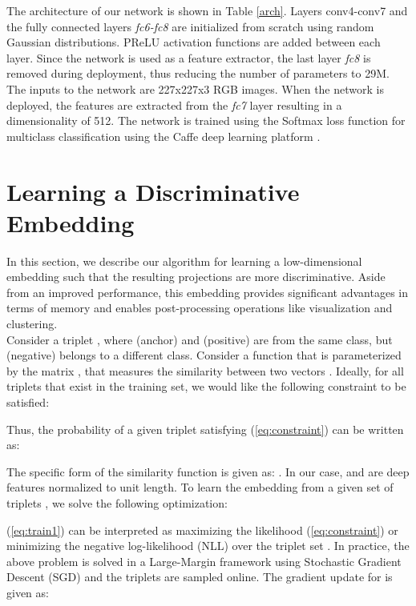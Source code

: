 \documentclass[10pt,twocolumn,letterpaper]{article}
\begin{document}
The architecture of our network is shown in Table \ref{arch}. Layers
conv4-conv7 and the fully connected layers \textit{fc6-fc8} are initialized from
scratch using random Gaussian distributions. PReLU activation functions are added
between each layer. Since the network is used as a feature extractor, the last
layer \textit{fc8} is removed during deployment, thus reducing the number of
parameters to 29M. The inputs to the network are 227x227x3 RGB images. When the
network is deployed, the features are extracted from the \textit{fc7} layer
resulting in a dimensionality of 512. The network is trained using the Softmax
loss function for multiclass classification using the Caffe deep learning
platform \cite{caffe}. 


 \section{Learning a Discriminative Embedding}\label{tpe}
In this section, we describe our algorithm for learning a low-dimensional
embedding such that the resulting projections are more discriminative. Aside
from an improved performance, this embedding provides significant advantages in
terms of memory and enables post-processing operations like visualization and clustering. \\

Consider a triplet , where  (anchor)
and  (positive) are from the same class, but  (negative)
belongs to a different class. Consider a function  that is parameterized by the matrix , that measures the similarity between two vectors
. Ideally, for all triplets  that exist
in the training set, we would like the following constraint to be satisfied: 

\vspace{-5mm}

Thus, the probability of a given triplet  satisfying (\ref{eq:constraint}) can be written as:
\vspace{-2.5mm}


The specific form of the similarity function is given as:
. In our case,  and  are deep features normalized to unit length. To learn the embedding  from a given set of triplets , we solve the following optimization:
\vspace{-2.5mm}


(\ref{eq:train1}) can be interpreted as maximizing the likelihood
(\ref{eq:constraint}) or minimizing the negative log-likelihood (NLL) over the
triplet set .  In practice, the above problem is solved in a
Large-Margin framework using Stochastic Gradient Descent (SGD) and the triplets
are sampled online. The gradient update for  is given as:
\end{document}
